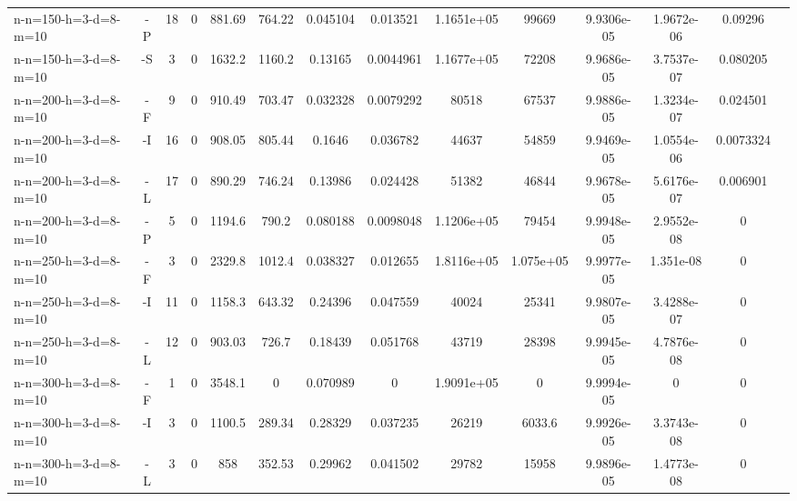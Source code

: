 \documentclass[landscape, a4paper]{article}
\begin{document}
\begin{center}
\begin{tabular}{lccccccccccccc}
n-n=150-h=3-d=8-m=10 & -P & 18 & 0 & 881.69 & 764.22 & 0.045104 & 0.013521 & 1.1651e+05 & 99669 & 9.9306e-05 & 1.9672e-06 & 0.09296 & \\
n-n=150-h=3-d=8-m=10 & -S & 3 & 0 & 1632.2 & 1160.2 & 0.13165 & 0.0044961 & 1.1677e+05 & 72208 & 9.9686e-05 & 3.7537e-07 & 0.080205 & \\
n-n=200-h=3-d=8-m=10 & -F & 9 & 0 & 910.49 & 703.47 & 0.032328 & 0.0079292 & 80518 & 67537 & 9.9886e-05 & 1.3234e-07 & 0.024501 & \\
n-n=200-h=3-d=8-m=10 & -I & 16 & 0 & 908.05 & 805.44 & 0.1646 & 0.036782 & 44637 & 54859 & 9.9469e-05 & 1.0554e-06 & 0.0073324 & \\
n-n=200-h=3-d=8-m=10 & -L & 17 & 0 & 890.29 & 746.24 & 0.13986 & 0.024428 & 51382 & 46844 & 9.9678e-05 & 5.6176e-07 & 0.006901 & \\
n-n=200-h=3-d=8-m=10 & -P & 5 & 0 & 1194.6 & 790.2 & 0.080188 & 0.0098048 & 1.1206e+05 & 79454 & 9.9948e-05 & 2.9552e-08 & 0 & \\
n-n=250-h=3-d=8-m=10 & -F & 3 & 0 & 2329.8 & 1012.4 & 0.038327 & 0.012655 & 1.8116e+05 & 1.075e+05 & 9.9977e-05 & 1.351e-08 & 0 & \\
n-n=250-h=3-d=8-m=10 & -I & 11 & 0 & 1158.3 & 643.32 & 0.24396 & 0.047559 & 40024 & 25341 & 9.9807e-05 & 3.4288e-07 & 0 & \\
n-n=250-h=3-d=8-m=10 & -L & 12 & 0 & 903.03 & 726.7 & 0.18439 & 0.051768 & 43719 & 28398 & 9.9945e-05 & 4.7876e-08 & 0 & \\
n-n=300-h=3-d=8-m=10 & -F & 1 & 0 & 3548.1 & 0 & 0.070989 & 0 & 1.9091e+05 & 0 & 9.9994e-05 & 0 & 0 & \\
n-n=300-h=3-d=8-m=10 & -I & 3 & 0 & 1100.5 & 289.34 & 0.28329 & 0.037235 & 26219 & 6033.6 & 9.9926e-05 & 3.3743e-08 & 0 & \\
n-n=300-h=3-d=8-m=10 & -L & 3 & 0 & 858 & 352.53 & 0.29962 & 0.041502 & 29782 & 15958 & 9.9896e-05 & 1.4773e-08 & 0 & \\
\end{tabular}
\end{center}
\end{document}
